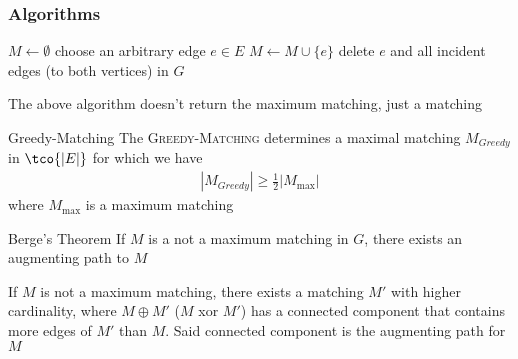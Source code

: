 \subsubsection{Algorithms}
\begin{algorithm}
    \caption{\textsc{Greedy-Matching}$(G)$}
    \begin{algorithmic}[1]
        \State $M \gets \emptyset$
            \State choose an arbitrary edge $e \in E$ 
            \State $M \gets M \cup \{e\}$
            \State delete $e$ and all incident edges (to both vertices) in $G$
        \EndWhile
    \end{algorithmic}
\end{algorithm}
The above algorithm doesn't return the maximum matching, just a matching
\begin{theorem}[]{Greedy-Matching}
    The \textsc{Greedy-Matching} determines a maximal matching $M_{Greedy}$ in $\tco{|E|}$ for which we have
    \begin{align*}
        |M_{Greedy}| \geq \frac{1}{2} |M_{\max}|
    \end{align*}
    where $M_{\max}$ is a maximum matching
\end{theorem}

\begin{theorem}[]{Berge's Theorem}
    If $M$ is a not a maximum matching in $G$, there exists an augmenting path to $M$
\end{theorem}
\inlineproof If $M$ is not a maximum matching, there exists a matching $M'$ with higher cardinality, where $M \oplus M'$ ($M$ xor $M'$) has a connected component that contains more edges of $M'$ than $M$. Said connected component is the augmenting path for $M$

